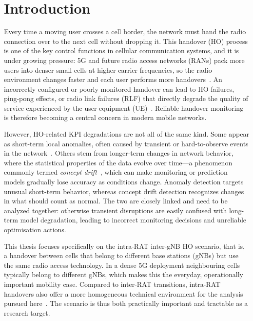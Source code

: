 \chapter{Introduction}
\label{ch:intro}

Every time a moving user crosses a cell border, the network must hand the radio connection over to the next cell without dropping it. This handover (HO) process is one of the key control functions in cellular communication systems, and it is under growing pressure: 5G and future radio access networks (RANs) pack more users into denser small cells at higher carrier frequencies, so the radio environment changes faster and each user performs more handovers~\cite{hoMgmtSurvey2025}. An incorrectly configured or poorly monitored handover can lead to HO failures, ping-pong effects, or radio link failures (RLF) that directly degrade the quality of service experienced by the user equipment (UE)~\cite{tr36839}. Reliable handover monitoring is therefore becoming a central concern in modern mobile networks.

However, HO-related KPI degradations are not all of the same kind. Some appear as short-term local anomalies, often caused by transient or hard-to-observe events in the network~\cite{chandola2009anomaly}. Others stem from longer-term changes in network behavior, where the statistical properties of the data evolve over time---a phenomenon commonly termed \emph{concept drift}~\cite{gama2014survey,lu2018drift}, which can make monitoring or prediction models gradually lose accuracy as conditions change. Anomaly detection targets unusual short-term behavior, whereas concept drift detection recognizes changes in what should count as normal. The two are closely linked and need to be analyzed together: otherwise transient disruptions are easily confused with long-term model degradation, leading to incorrect monitoring decisions and unreliable optimisation actions.

This thesis focuses specifically on the intra-RAT inter-gNB HO scenario, that is, a handover between cells that belong to different base stations (gNBs) but use the same radio access technology. In a dense 5G deployment neighbouring cells typically belong to different gNBs, which makes this the everyday, operationally important mobility case. Compared to inter-RAT transitions, intra-RAT handovers also offer a more homogeneous technical environment for the analysis pursued here~\cite{ts38300,ts37340}. The scenario is thus both practically important and tractable as a research target.

